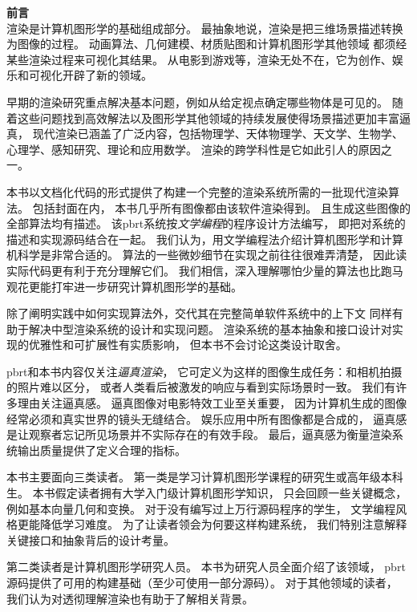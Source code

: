 {\Huge\bfseries 前言}\vspace{30pt}\\

渲染是计算机图形学的基础组成部分。
最抽象地说，渲染是把三维场景描述转换为图像的过程。
动画算法、几何建模、材质贴图和计算机图形学其他领域
都须经某些渲染过程来可视化其结果。
从电影到游戏等，渲染无处不在，它为创作、娱乐和可视化开辟了新的领域。

早期的渲染研究重点解决基本问题，例如从给定视点确定哪些物体是可见的。
随着这些问题找到高效解法以及图形学其他领域的持续发展使得场景描述更加丰富逼真，
现代渲染已涵盖了广泛内容，包括物理学、天体物理学、天文学、生物学、心理学、感知研究、理论和应用数学。
渲染的跨学科性是它如此引人的原因之一。

本书以文档化代码的形式提供了构建一个完整的渲染系统所需的一批现代渲染算法。
包括封面在内，
本书几乎所有图像都由该软件渲染得到。
且生成这些图像的全部算法均有描述。
该pbrt系统按{\itshape 文学编程}的程序设计方法编写，
即把对系统的描述和实现源码结合在一起。
我们认为，用文学编程法介绍计算机图形学和计算机科学是非常合适的。
算法的一些微妙细节在实现之前往往很难弄清楚，
因此读实际代码更有利于充分理解它们。
我们相信，深入理解哪怕少量的算法也比跑马观花更能打牢进一步研究计算机图形学的基础。

除了阐明实践中如何实现算法外，交代其在完整简单软件系统中的上下文
同样有助于解决中型渲染系统的设计和实现问题。
渲染系统的基本抽象和接口设计对实现的优雅性和可扩展性有实质影响，
但本书不会讨论这类设计取舍。

pbrt和本书内容仅关注{\itshape 逼真渲染}，
它可定义为这样的图像生成任务：和相机拍摄的照片难以区分，
或者人类看后被激发的响应与看到实际场景时一致。
我们有许多理由关注逼真感。
逼真图像对电影特效工业至关重要，
因为计算机生成的图像经常必须和真实世界的镜头无缝结合。
娱乐应用中所有图像都是合成的，
逼真感是让观察者忘记所见场景并不实际存在的有效手段。
最后，逼真感为衡量渲染系统输出质量提供了定义合理的指标。\\


本书主要面向三类读者。
第一类是学习计算机图形学课程的研究生或高年级本科生。
本书假定读者拥有大学入门级计算机图形学知识，
只会回顾一些关键概念，例如基本向量几何和变换。
对于没有编写过上万行源码程序的学生，
文学编程风格更能降低学习难度。
为了让读者领会为何要这样构建系统，
我们特别注意解释关键接口和抽象背后的设计考量。

第二类读者是计算机图形学研究人员。
本书为研究人员全面介绍了该领域，
pbrt源码提供了可用的构建基础（至少可使用一部分源码）。
对于其他领域的读者，
我们认为对透彻理解渲染也有助于了解相关背景。


